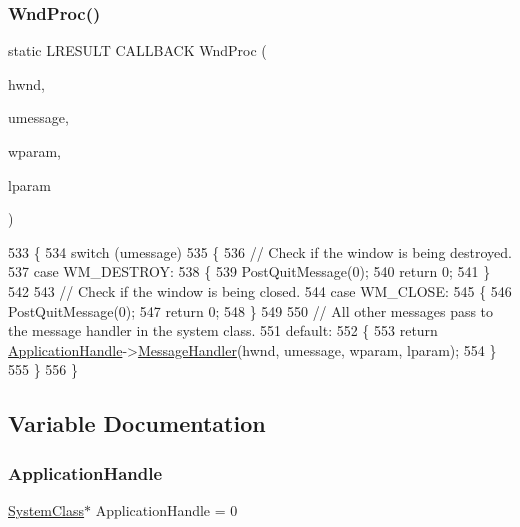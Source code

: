 \subsubsection{\texorpdfstring{Wnd\+Proc()}{WndProc()}}
{\footnotesize\ttfamily static L\+R\+E\+S\+U\+LT C\+A\+L\+L\+B\+A\+CK Wnd\+Proc (\begin{DoxyParamCaption}\item[{H\+W\+ND}]{hwnd,  }\item[{U\+I\+NT}]{umessage,  }\item[{W\+P\+A\+R\+AM}]{wparam,  }\item[{L\+P\+A\+R\+AM}]{lparam }\end{DoxyParamCaption})\hspace{0.3cm}{\ttfamily [static]}}


\begin{DoxyCode}
533 \{
534     \textcolor{keywordflow}{switch} (umessage)
535     \{
536         \textcolor{comment}{// Check if the window is being destroyed.}
537     \textcolor{keywordflow}{case} WM\_DESTROY:
538     \{
539         PostQuitMessage(0);
540         \textcolor{keywordflow}{return} 0;
541     \}
542 
543     \textcolor{comment}{// Check if the window is being closed.}
544     \textcolor{keywordflow}{case} WM\_CLOSE:
545     \{
546         PostQuitMessage(0);
547         \textcolor{keywordflow}{return} 0;
548     \}
549 
550     \textcolor{comment}{// All other messages pass to the message handler in the system class.}
551     \textcolor{keywordflow}{default}:
552     \{
553         \textcolor{keywordflow}{return} \hyperlink{group__system_ga91fa2e9b9bad2bce97a4f7e9b5337e1a}{ApplicationHandle}->\hyperlink{class_system_class_aeb0f9940a9a82a36f13e267e3989a98b}{MessageHandler}(hwnd, umessage, wparam, 
      lparam);
554     \}
555     \}
556 \}
\end{DoxyCode}


\subsection{Variable Documentation}
\mbox{\label{group__system_ga91fa2e9b9bad2bce97a4f7e9b5337e1a}} 
\subsubsection{\texorpdfstring{Application\+Handle}{ApplicationHandle}}
{\footnotesize\ttfamily \hyperlink{class_system_class}{System\+Class}$\ast$ Application\+Handle = 0\hspace{0.3cm}{\ttfamily [static]}}

